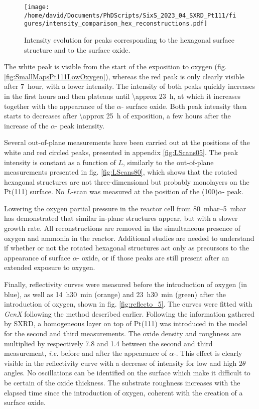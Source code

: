 \begin{figure}[!htb]
    \centering
    \texttt{[image: /home/david/Documents/PhDScripts/SixS\_2023\_04\_SXRD\_Pt111/figures/intensity\_comparison\_hex\_reconstructions.pdf]}
    \caption{
        Intensity evolution for peaks corresponding to the hexagonal surface structure and to the surface oxide.
    }
    \label{fig:HexBraggPeaks}
\end{figure}

The white peak is visible from the start of the exposition to oxygen (fig. \ref{fig:SmallMapsPt111LowOxygen}), whereas the red peak is only clearly visible after \qty{7}{hour}, with a lower intensity.
The intensity of both peaks quickly increases in the first hours and then plateaus until \qty{\approx 23}{\hour}, at which it increases together with the appearance of the $\alpha$- surface oxide.
Both peak intensity then starts to decreases after \qty{\approx 25}{\hour} of exposition, a few hours after the increase of the $\alpha$- peak intensity.

Several out-of-plane measurements have been carried out at the positions of the white and red circled peaks, presented in appendix \ref{fig:LScans05}.
The peak intensity is constant as a function of $L$, similarly to the out-of-plane measurements presented in fig. \ref{fig:LScans80}, which shows that the rotated hexagonal structures are not three-dimensional but probably monolayers on the Pt(111) surface.
No $L$-scan was measured at the position of the (100)$\alpha$- peak.

Lowering the oxygen partial pressure in the reactor cell from \qtyrange{80}{5}{\milli\bar} has demonstrated that similar in-plane structures appear, but with a slower growth rate.
All reconstructions are removed in the simultaneous presence of oxygen and ammonia in the reactor.
Additional studies are needed to understand if whether or not the rotated hexagonal structures act only as precursors to the appearance of surface $\alpha$- oxide, or if those peaks are still present after an extended exposure to oxygen.

Finally, reflectivity curves were measured before the introduction of oxygen (in blue), as well as \qty{14}{\hour}\qty{30}{\minute} (orange) and \qty{23}{\hour}\qty{30}{\minute} (green) after the introduction of oxygen, shown in fig. \ref{fig:reflecto_5}.
The curves were fitted with \textit{GenX} following the method described earlier.
Following the information gathered by SXRD, a homogeneous layer on top of Pt(111) was introduced in the model for the second and third measurements.
The oxide density and roughness are multiplied by respectively \num{7.8} and \num{1.4} between the second and third measurement, \textit{i.e.} before and after the appearance of $\alpha$-.
This effect is clearly visible in the reflectivity curve with a decrease of intensity for low and high $2\theta$ angles.
No oscillations can be identified on the surface which make it difficult to be certain of the oxide thickness.
The substrate roughness increases with the elapsed time since the introduction of oxygen, coherent with the creation of a surface oxide.

